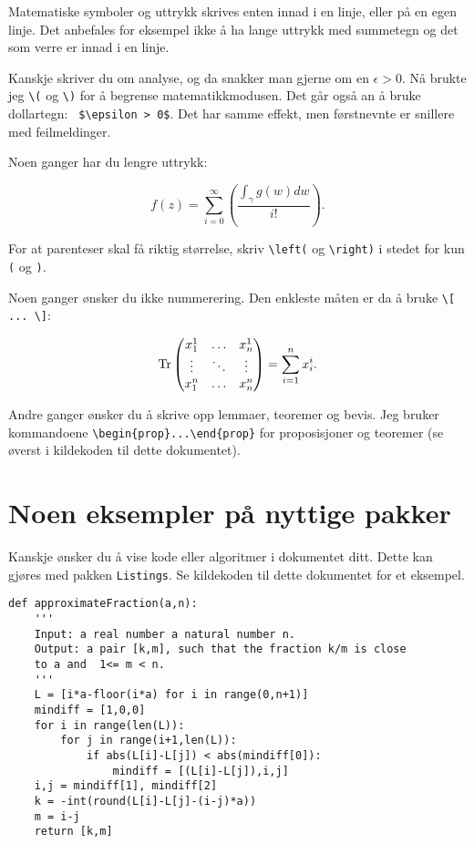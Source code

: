 \documentclass[11pt, english, a4paper]{article}
\begin{document}
Matematiske symboler og uttrykk skrives enten innad i en linje, eller på en egen linje. Det anbefales for eksempel ikke å ha lange uttrykk med summetegn og det som verre er innad i en linje.

Kanskje skriver du om analyse, og da snakker man gjerne om en \(\epsilon > 0 \). Nå brukte jeg \verb|\(| og \verb|\)| for å begrense matematikkmodusen. Det går også an å bruke dollartegn: \verb| $\epsilon > 0$|. Det har samme effekt, men førstnevnte er snillere med feilmeldinger.

Noen ganger har du lengre uttrykk:

\begin{equation}
f(z) = \sum_{i=0}^\infty \left( 
\frac{\int_\gamma g(w) dw}{i!}
\right).
\end{equation}

For at parenteser skal få riktig størrelse, skriv \verb|\left(| og \verb|\right)| i stedet for kun \texttt{(} og \texttt{)}.

Noen ganger ønsker du ikke nummerering. Den enkleste måten er da å bruke \verb|\[ ... \]|:

\[
\operatorname{Tr} \begin{pmatrix}
x_1^1 & \hdots & x_n^1 \\
\vdots & \ddots &  \vdots \\
x_1^n & \hdots & x_n^n
\end{pmatrix} = \sum_{i=1}^n x_i^i.
\]

Andre ganger ønsker du å skrive opp lemmaer, teoremer og bevis. Jeg bruker kommandoene \verb|\begin{prop}...\end{prop}| for proposisjoner og teoremer (se øverst i kildekoden til dette dokumentet). 


\section{Noen eksempler på nyttige pakker}

Kanskje ønsker du å vise kode eller algoritmer i dokumentet ditt. Dette kan gjøres med pakken \texttt{Listings}. Se kildekoden til dette dokumentet for et eksempel. 

\begin{lstlisting}
def approximateFraction(a,n):
	'''
	Input: a real number a natural number n.
	Output: a pair [k,m], such that the fraction k/m is close 
	to a and  1<= m < n.
	'''
	L = [i*a-floor(i*a) for i in range(0,n+1)]
	mindiff = [1,0,0]
	for i in range(len(L)):
		for j in range(i+1,len(L)):
			if abs(L[i]-L[j]) < abs(mindiff[0]):
				mindiff = [(L[i]-L[j]),i,j]
	i,j = mindiff[1], mindiff[2]
	k = -int(round(L[i]-L[j]-(i-j)*a))
	m = i-j
	return [k,m]
\end{lstlisting}
\end{document}
